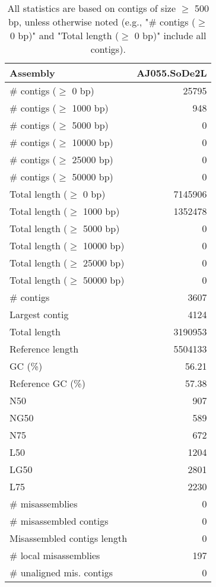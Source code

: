 \documentclass[12pt,a4paper]{article}
\begin{document}
\begin{table}[ht]
\begin{center}
\caption{All statistics are based on contigs of size $\geq$ 500 bp, unless otherwise noted (e.g., "\# contigs ($\geq$ 0 bp)" and "Total length ($\geq$ 0 bp)" include all contigs).}
\begin{tabular}{|l*{1}{|r}|}
\hline
Assembly & AJ055.SoDe2L \\ \hline
\# contigs ($\geq$ 0 bp) & 25795 \\ \hline
\# contigs ($\geq$ 1000 bp) & 948 \\ \hline
\# contigs ($\geq$ 5000 bp) & 0 \\ \hline
\# contigs ($\geq$ 10000 bp) & 0 \\ \hline
\# contigs ($\geq$ 25000 bp) & 0 \\ \hline
\# contigs ($\geq$ 50000 bp) & 0 \\ \hline
Total length ($\geq$ 0 bp) & 7145906 \\ \hline
Total length ($\geq$ 1000 bp) & 1352478 \\ \hline
Total length ($\geq$ 5000 bp) & 0 \\ \hline
Total length ($\geq$ 10000 bp) & 0 \\ \hline
Total length ($\geq$ 25000 bp) & 0 \\ \hline
Total length ($\geq$ 50000 bp) & 0 \\ \hline
\# contigs & 3607 \\ \hline
Largest contig & 4124 \\ \hline
Total length & 3190953 \\ \hline
Reference length & 5504133 \\ \hline
GC (\%) & 56.21 \\ \hline
Reference GC (\%) & 57.38 \\ \hline
N50 & 907 \\ \hline
NG50 & 589 \\ \hline
N75 & 672 \\ \hline
L50 & 1204 \\ \hline
LG50 & 2801 \\ \hline
L75 & 2230 \\ \hline
\# misassemblies & 0 \\ \hline
\# misassembled contigs & 0 \\ \hline
Misassembled contigs length & 0 \\ \hline
\# local misassemblies & 197 \\ \hline
\# unaligned mis. contigs & 0 \\ \hline

\end{tabular}
\end{center}
\end{table}
\end{document}
